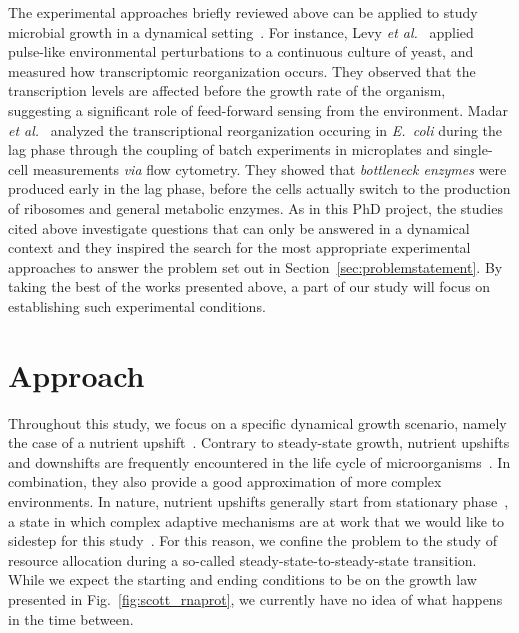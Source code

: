 The experimental approaches briefly reviewed above can be applied to study microbial growth in a dynamical setting~\cite{levy_strategy_2007,levy_coordination_2009,madar_promoter_2013,ehrenberg_mediumdependent_2012}.
For instance, Levy \textit{et al.}~\cite{levy_strategy_2007,levy_coordination_2009} applied pulse-like environmental perturbations to a continuous culture of yeast, and measured how transcriptomic reorganization occurs.
They observed that the transcription levels are affected before the growth rate of the organism, suggesting a significant role of feed-forward sensing from the environment.
Madar \textit{et al.}~\cite{madar_promoter_2013} analyzed the transcriptional reorganization occuring in \textit{E.~coli} during the lag phase through the coupling of batch experiments in microplates and single-cell measurements \textit{via} flow cytometry.
They showed that \textit{bottleneck enzymes} were produced early in the lag phase, before the cells actually switch to the production of ribosomes and general metabolic enzymes.
As in this PhD project, the studies cited above investigate questions that can only be answered in a dynamical context and they inspired the search for the most appropriate experimental approaches to answer the problem set out in Section~\ref{sec:problemstatement}.
By taking the best of the works presented above, a part of our study will focus on establishing such experimental conditions.

\section{Approach}
\label{sec:approach}

Throughout this study, we focus on a specific dynamical growth scenario, namely the case of a nutrient upshift~\cite{ehrenberg_mediumdependent_2012,kjeldgaard_kinetics_1961,schaechter_patterns_1961,johnsen_control_1977}.
Contrary to steady-state growth, nutrient upshifts and downshifts are frequently encountered in the life cycle of microorganisms~\cite{schaechter_microbe_2006,mcarthur_microbial_2006,menge_nitrogen_2012,hobbie_microbes_2013}.
In combination, they also provide a good approximation of more complex environments.
In nature, nutrient upshifts generally start from stationary phase~\cite{mcarthur_microbial_2006,menge_nitrogen_2012,hobbie_microbes_2013}, a state in which complex adaptive mechanisms are at work that we would like to sidestep for this study~\cite{stragier_molecular_1996,gonzalez-pastor_cannibalism:_2011,ng_damage_1962,dufrenne_effect_1997,shaw_effect_1967,mcmeekin_predictive_2002,cheroutre-vialette_application_2002}.
For this reason, we confine the problem to the study of resource allocation during a so-called steady-state-to-steady-state transition.
While we expect the starting and ending conditions to be on the growth law presented in Fig.~\ref{fig:scott_rnaprot}, we currently have no idea of what happens in the time between.

